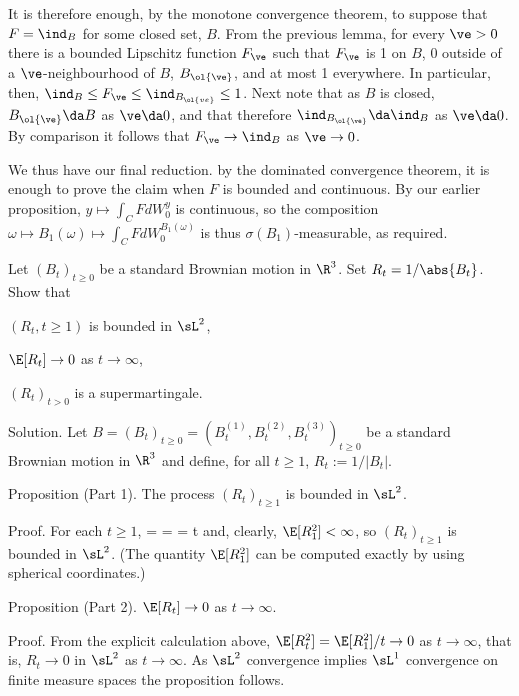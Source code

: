 It is therefore enough, by the monotone convergence theorem, to suppose that $F = \ind_B$ for some closed set, $B$. From the previous lemma, for every $\ve > 0$ there is a bounded Lipschitz function $F_\ve$ such that $F_\ve$ is 1 on $B$, 0 outside of a $\ve$-neighbourhood of $B$, $B_{\ol{\ve}}$, and at most 1 everywhere. In particular, then, $\ind_B \leq F_\ve \leq \ind_{B_{\ol{ve}}} \leq 1$. Next note that as $B$ is closed, $B_{\ol{\ve}} \da B$ as $\ve \da  0$, and that therefore $\ind_{B_{\ol{\ve}}} \da \ind_B$ as $\ve \da  0$. By comparison it follows that $F_\ve \to \ind_B$ as $\ve \to 0$.

We thus have our final reduction. by the dominated convergence theorem, it is enough to prove the claim when $F$ is bounded and continuous. By our earlier proposition, $y \mapsto \int_C F dW^y_0$ is continuous, so the composition $\omega \mapsto B_1(\omega) \mapsto \int_C F dW^{B_1(\omega)}_0$ is thus $\sigma(B_1)$-measurable, as required.

\vspace{2mm}

\qcutline


\item Let $(B_t)_{t\geq 0}$ be a standard Brownian motion in $\R^3$. Set $R_t = 1/\abs{B_t}$. Show that
\ben
\item [(i)] $(R_t, t \geq  1)$ is bounded in $\sL^2$,
\item [(ii)] $\E[R_t] \to 0$ as $t \to \infty$,
\item [(iii)] $(R_t)_{t>0}$ is a supermartingale.
\een

\scutline

Solution. Let $B = (B_t)_{t\geq 0} = (B^{(1)}_t , B^{(2)}_t , B^{(3)}_t )_{t\geq0}$ be a standard Brownian motion in $\R^3$ and define, for all $t \geq 1$, $R_t := 1/|B_t|$.

Proposition (Part 1). The process $(R_t)_{t\geq1}$ is bounded in $\sL^2$.

Proof. For each $t \geq 1$,
\be
\E[R^2_t] = \E{} = \E{} = \frac{\E[R^2_1}t \leq \E[R^2_1]
\ee
and, clearly, $\E[R^2_1] < \infty$, so $(R_t)_{t\geq1}$ is bounded in $\sL^2$. (The quantity $\E[R^2_1]$ can be computed exactly by using spherical coordinates.)

Proposition (Part 2). $\E[R_t] \to 0$ as $t \to \infty$.

Proof. From the explicit calculation above, $\E[R^2_t] = \E[R^2_1]/t \to 0$ as $t \to \infty$, that is, $R_t \to 0$ in $\sL^2$ as $t \to \infty$. As $\sL^2$ convergence implies $\sL^1$ convergence on finite measure spaces the proposition follows.

